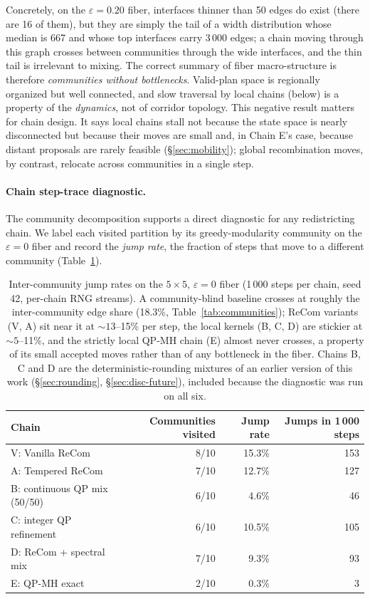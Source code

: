 \documentclass[11pt]{article}
\begin{document}
Concretely, on the $\varepsilon = 0.20$ fiber, interfaces thinner than
50 edges do exist (there are 16 of them), but they are simply the tail
of a width distribution whose median is 667 and whose top interfaces
carry $3\,000$ edges; a chain moving through this graph crosses
between communities through the wide interfaces, and the thin tail is
irrelevant to mixing. The correct summary of fiber macro-structure is
therefore \emph{communities without bottlenecks}. Valid-plan space is
regionally organized but well connected, and slow traversal by local
chains (below) is a property of the \emph{dynamics}, not of corridor
topology. This negative result matters for chain design. It says
local chains stall not because the state space is nearly disconnected
but because their moves are small and, in Chain E's case, because
distant proposals are rarely feasible (\S\ref{sec:mobility}); global
recombination moves, by
contrast, relocate across communities in a single step.

\paragraph{Chain step-trace diagnostic.}\label{sec:fiber-trace}

The community decomposition supports a direct diagnostic for any
redistricting chain. We label each visited partition by its
greedy-modularity community on the $\varepsilon = 0$ fiber and record
the \emph{jump rate}, the fraction of steps that move to a
different community (Table~\ref{tab:island-trace}).

\begin{table}[htbp]
\centering
\small
\begin{tabular}{lrrr}
\toprule
Chain & Communities visited & Jump rate & Jumps in 1\,000 steps \\
\midrule
V: Vanilla ReCom        & 8/10 & 15.3\% & 153 \\
A: Tempered ReCom       & 7/10 & 12.7\% & 127 \\
B: continuous QP mix (50/50) & 6/10 & 4.6\%  & 46  \\
C: integer QP refinement     & 6/10 & 10.5\% & 105 \\
D: ReCom + spectral mix & 7/10 & 9.3\%  & 93  \\
E: QP-MH exact          & 2/10 & 0.3\%  & 3   \\
\bottomrule
\end{tabular}
\caption{Inter-community jump rates on the $5 \times 5$,
  $\varepsilon = 0$ fiber (1\,000 steps per chain, seed 42, per-chain
  RNG streams). A community-blind baseline crosses at roughly the
  inter-community edge share (18.3\%,
  Table~\ref{tab:communities}); ReCom variants (V, A) sit near it
  at $\sim 13$--15\% per step, the local kernels (B, C, D) are
  stickier at $\sim 5$--11\%, and the strictly local QP-MH chain (E)
  almost never crosses, a property of its small accepted moves rather
  than of any bottleneck in the fiber. Chains B, C and D are the
  deterministic-rounding mixtures of an earlier version of this work
  (\S\ref{sec:rounding}, \S\ref{sec:disc-future}), included because
  the diagnostic was run on all six.}\label{tab:island-trace}
\end{table}
\end{document}
